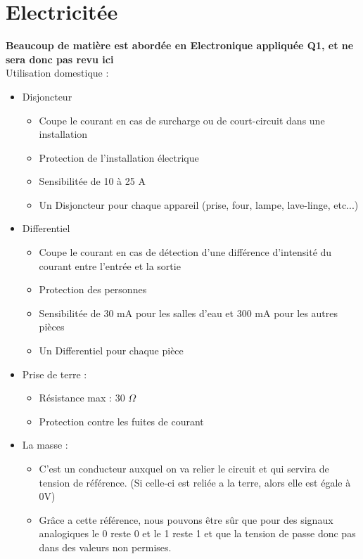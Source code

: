 \documentclass[a4paper]{article}
\begin{document}
\newpage
\section{Electricitée}
\textbf{Beaucoup de matière est abordée en Electronique appliquée Q1, et ne sera donc pas revu ici}\\[0.5cm]

Utilisation domestique :
\begin{itemize}
    \vspace{0.5cm}
    \item Disjoncteur
    \begin{itemize}
        \item Coupe le courant en cas de surcharge ou de court-circuit dans une installation
        \item Protection de l'installation électrique
        \item Sensibilitée de 10 à 25 A
        \item Un Disjoncteur pour chaque appareil (prise, four, lampe, lave-linge, etc...)
    \end{itemize}
    \vspace{0.5cm}
    \item Differentiel
    \begin{itemize}
        \item Coupe le courant en cas de détection d'une différence d'intensité du courant entre l'entrée et la sortie
        \item Protection des personnes
        \item Sensibilitée de 30 mA pour les salles d'eau et 300 mA pour les autres pièces
        \item Un Differentiel pour chaque pièce
    \end{itemize}
    \vspace{0.5cm}
    \item Prise de terre :
    \begin{itemize}
        \item Résistance max : 30 $\Omega$
        \item Protection contre les fuites de courant
    \end{itemize}
    \vspace{0.5cm}
    \item La masse :
    \begin{itemize}
        \item C'est un conducteur auxquel on va relier le circuit et qui servira de tension de référence. (Si celle-ci est reliée a la terre, alors elle est égale à 0V)
        \item Grâce a cette référence, nous pouvons être sûr que pour des signaux analogiques
        le 0 reste 0 et le 1 reste 1 et que la tension de passe donc pas dans des valeurs non permises.
    \end{itemize}
\end{itemize}
\end{document}
